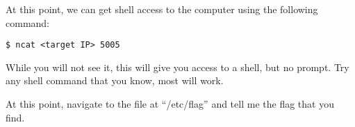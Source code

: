 			At this point, we can get shell access to the computer using the following command:
			\begin{lstlisting}[style=CLI]
				$ ncat <target IP> 5005
			\end{lstlisting}
			While you will not see it, this will give you access to a shell, but no prompt. 
			Try any shell command that you know, most will work. 
			
			At this point, navigate to the file at ``/etc/flag'' and tell me the flag that you find. 
			
